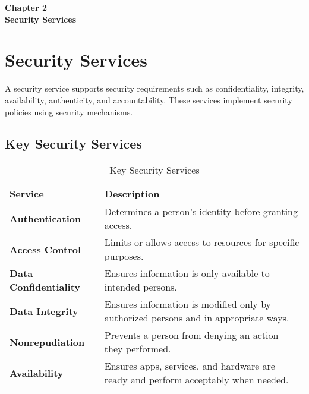 \clearpage
\thispagestyle{empty} 
\begin{center}
    \vspace*{\fill} 
    \Huge \textbf{Chapter 2} \\
    \Huge \textbf{Security Services} 
    \vspace*{\fill}
\end{center}
\clearpage

\chapter{Security Services}

A security service supports security requirements such as confidentiality, integrity, availability, authenticity, and accountability. These services implement security policies using security mechanisms.

\section{Key Security Services}
\begin{table}[h!]
    \centering
\begin{tabular}{|p{3.5cm}|p{9cm}|}
    \hline
    \textbf{Service} & \textbf{Description} \\ \hline
    \textbf{Authentication} & Determines a person’s identity before granting access.\index{Authentication} \\ \hline
    \textbf{Access Control} & Limits or allows access to resources for specific purposes.\index{Access Control} \\ \hline
    \textbf{Data Confidentiality} & Ensures information is only available to intended persons.\index{Data Confidentiality} \\ \hline
    \textbf{Data Integrity} & Ensures information is modified only by authorized persons and in appropriate ways.\index{Data Integrity} \\ \hline
    \textbf{Nonrepudiation} & Prevents a person from denying an action they performed.\index{Nonrepudiation} \\ \hline
    \textbf{Availability} & Ensures apps, services, and hardware are ready and perform acceptably when needed.\index{Availability} \\ \hline
\end{tabular}
\caption{Key Security Services}
\end{table}

